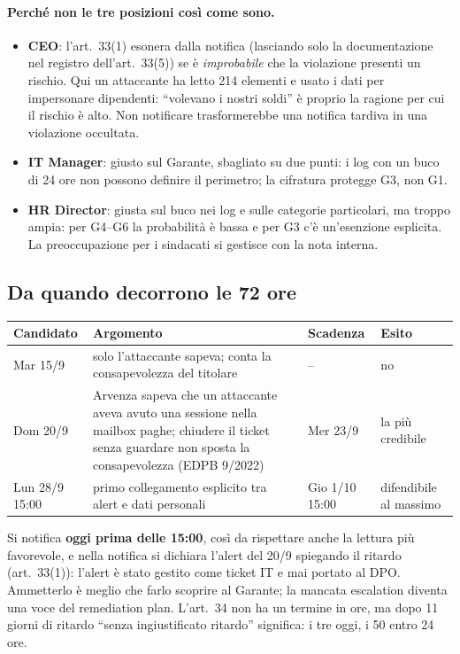 \paragraph{Perché non le tre posizioni così come sono.}
\begin{itemize}
  \item \textbf{CEO}: l'art.~33(1) esonera dalla notifica (lasciando solo la documentazione nel registro
    dell'art.~33(5)) se è \emph{improbabile} che la violazione presenti un rischio. Qui un attaccante ha letto 214 elementi e usato i dati per impersonare
    dipendenti: ``volevano i nostri soldi'' è proprio la ragione per cui il rischio è alto. Non
    notificare trasformerebbe una notifica tardiva in una violazione occultata.
  \item \textbf{IT Manager}: giusto sul Garante, sbagliato su due punti: i log con un buco di 24 ore
    non possono definire il perimetro; la cifratura protegge G3, non G1.
  \item \textbf{HR Director}: giusta sul buco nei log e sulle categorie particolari, ma troppo ampia:
    per G4--G6 la probabilità è bassa e per G3 c'è un'esenzione esplicita. La preoccupazione per i
    sindacati si gestisce con la nota interna.
\end{itemize}

\subsection{Da quando decorrono le 72 ore}
\begin{center}
\small
\begin{tabularx}{\linewidth}{l X l l}
\toprule
\textbf{Candidato} & \textbf{Argomento} & \textbf{Scadenza} & \textbf{Esito} \\ \midrule
Mar 15/9 & solo l'attaccante sapeva; conta la consapevolezza del titolare & -- & no \\
Dom 20/9 & Arvenza sapeva che un attaccante aveva avuto una sessione nella mailbox paghe; chiudere il
  ticket senza guardare non sposta la consapevolezza (EDPB 9/2022) & Mer 23/9 & la più credibile \\
Lun 28/9 15:00 & primo collegamento esplicito tra alert e dati personali & Gio 1/10 15:00 &
  difendibile al massimo \\
\bottomrule
\end{tabularx}
\end{center}
Si notifica \textbf{oggi prima delle 15:00}, così da rispettare anche la lettura più favorevole, e
nella notifica si dichiara l'alert del 20/9 spiegando il ritardo (art.~33(1)): l'alert è stato gestito
come ticket IT e mai portato al DPO. Ammetterlo è meglio che farlo scoprire al Garante; la mancata
escalation diventa una voce del remediation plan. L'art.~34 non ha un termine in ore, ma dopo 11
giorni di ritardo ``senza ingiustificato ritardo'' significa: i tre oggi, i 50 entro 24 ore.

